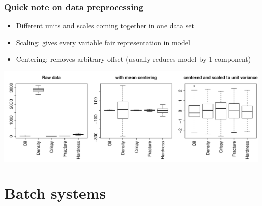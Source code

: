 \begin{frame}\frametitle{Quick note on data preprocessing}

\begin{itemize}
	
	\item	Different units and scales coming together in one data set
	
	\item	Scaling: gives every variable fair representation in model
	
	\item	Centering: removes arbitrary offset (usually reduces model by 1 component)
	
\end{itemize}

\begin{center}
	\includegraphics[width=\textwidth]{images/pca-on-food-texture-centering-and-scaling.png}
\end{center}
\end{frame}


\section{Batch systems}

